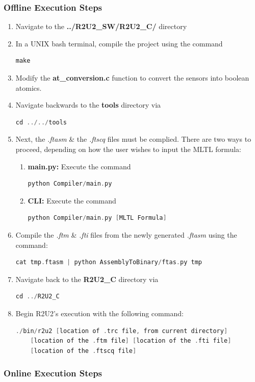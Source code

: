 \subsubsection{Offline Execution Steps}
\label{OfflineC}
\begin{enumerate}
	\item Navigate to the \textbf{../R2U2\_SW/R2U2\_C/} directory
	\item In a UNIX bash terminal, compile the project using the command
	\begin{lstlisting}[language=C]
	make
	\end{lstlisting}
	\item Modify the \textbf{at\_conversion.c} function to convert the sensors into boolean atomics.
	\item Navigate backwards to the \textbf{tools} directory via 
	\begin{lstlisting}[language=C]
	cd ../../tools
	\end{lstlisting}
	\item Next, the \textit{.ftasm} \& the \textit{.ftscq} files must be complied. There are two ways to proceed, depending on how the user wishes to input the MLTL formula:
	\begin{enumerate}
		\item \textbf{main.py:} Execute the command
		\begin{lstlisting}[language=C]		
		python Compiler/main.py
		\end{lstlisting}
		\item \textbf{CLI:} Execute the command
		\begin{lstlisting}[language=C]
		python Compiler/main.py [MLTL Formula]
		\end{lstlisting}
	\end{enumerate}
	\item Compile the \textit{.ftm} \& \textit{.fti} files from the newly generated \textit{.ftasm} using the command:
	\begin{lstlisting}[language=C]
	cat tmp.ftasm | python AssemblyToBinary/ftas.py tmp
	\end{lstlisting}
	\item Navigate back to the \textbf{R2U2\_C} directory via
	\begin{lstlisting}[language=C]
	cd ../R2U2_C
	\end{lstlisting}
	\item Begin R2U2's execution with the following command:
	\begin{lstlisting}[language=C]
	./bin/r2u2 [location of .trc file, from current directory] 
	[location of the .ftm file] [location of the .fti file] 
	[location of the .ftscq file]
	\end{lstlisting}

\end{enumerate}

\subsubsection{Online Execution Steps}
\label{OnlineC}


\clearpage
